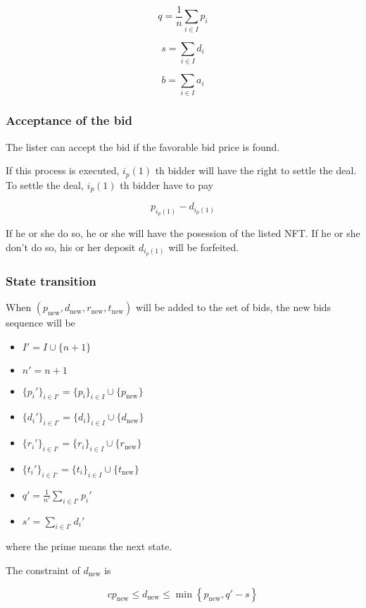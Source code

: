 \documentclass[dvipdfmx]{jsarticle}
\begin{document}
$$
  q = \frac{1}{n} \sum_{i \in I} p_i
$$

$$
  s = \sum_{i \in I} d_i
$$

$$
  b = \sum_{i \in I} a_i
$$

\subsubsection{Acceptance of the bid}

The lister can accept the bid if the favorable bid price is found.

If this process is executed, $i_p(1)$ th bidder will have the right to settle the deal.
To settle the deal, $i_p(1)$ th bidder have to pay

$$
  p_{i_p(1)} - d_{i_p(1)}
$$

If he or she do so, he or she will have the posession of the listed NFT.
If he or she don't do so, his or her deposit $d_{i_p(1)}$ will be forfeited.

\subsubsection{State transition}

When $(p_{\text{new}}, d_{\text{new}}, r_{\text{new}}, t_{\text{new}})$ will be added to the set of bids, the new bids sequence will be

\begin{itemize}
  \item $I' = I \cup \{n+1\}$
  \item $n' = n + 1$
  \item $\{p_i'\}_{i \in I'} = \{p_i\}_{i \in I} \cup \{p_{\text{new}}\}$
  \item $\{d_i'\}_{i \in I'} = \{d_i\}_{i \in I} \cup \{d_{\text{new}}\}$
  \item $\{r_i'\}_{i \in I'} = \{r_i\}_{i \in I} \cup \{r_{\text{new}}\}$
  \item $\{t_i'\}_{i \in I'} = \{t_i\}_{i \in I} \cup \{t_{\text{new}}\}$
  \item $q' = \frac{1}{n'} \sum_{i \in I'} p_i'$
  \item $s' = \sum_{i \in I'} d_i'$
\end{itemize}

where the prime means the next state.

The constraint of $d_{\text{new}}$ is

$$
  c p_{\text{new}} \le d_{\text{new}} \le \min \left\{ p_{\text{new}}, q' - s \right\} 
$$
\end{document}
